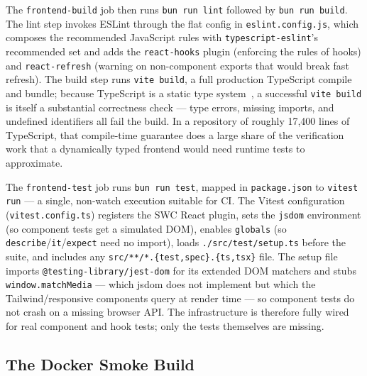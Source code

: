 The \texttt{frontend-build} job then runs \texttt{bun run lint} followed
by \texttt{bun run build}. The lint step invokes ESLint through the flat
config in \texttt{eslint.config.js}, which composes the recommended
JavaScript rules with \texttt{typescript-eslint}'s recommended set and
adds the \texttt{react-hooks} plugin (enforcing the rules of hooks) and
\texttt{react-refresh} (warning on non-component exports that would break
fast refresh). The build step runs \texttt{vite build}, a full
production TypeScript compile and bundle; because TypeScript is a
static type system~\cite{typescript}, a successful \texttt{vite build}
is itself a substantial correctness check --- type errors, missing
imports, and undefined identifiers all fail the build. In a repository of
roughly 17{,}400 lines of TypeScript, that compile-time guarantee does a
large share of the verification work that a dynamically typed frontend
would need runtime tests to approximate.

The \texttt{frontend-test} job runs \texttt{bun run test}, mapped in
\texttt{package.json} to \texttt{vitest run} --- a single, non-watch
execution suitable for CI. The Vitest configuration
(\texttt{vitest.config.ts}) registers the SWC React plugin, sets the
\texttt{jsdom} environment (so component tests get a simulated DOM),
enables \texttt{globals} (so \texttt{describe}/\texttt{it}/\texttt{expect}
need no import), loads \texttt{./src/test/setup.ts} before the suite, and
includes any \texttt{src/**/*.\{test,spec\}.\{ts,tsx\}} file. The setup
file imports \texttt{@testing-library/jest-dom} for its extended DOM
matchers and stubs \texttt{window.matchMedia} --- which jsdom does not
implement but which the Tailwind/responsive components query at render
time --- so component tests do not crash on a missing browser API. The
infrastructure is therefore fully wired for real component and hook
tests; only the tests themselves are missing.

\subsection{The Docker Smoke Build}

